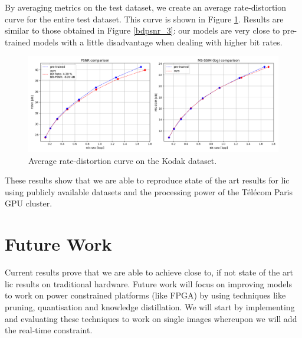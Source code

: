 By averaging metrics on the test dataset, we create an average rate-distortion curve for the entire test dataset. This curve is shown in Figure \ref{bdpsnr_4}. Results are similar to those obtained in Figure \ref{bdpsnr_3}: our models are very close to pre-trained models with a little disadvantage when dealing with higher bit rates.

\begin{figure}
    \centering
    \includegraphics[width=15cm]{img/balle_bdpsnr_4.png}
    \caption{Average rate-distortion curve on the Kodak dataset.}
    \label{bdpsnr_4}
\end{figure}

These results show that we are able to reproduce state of the art results for \acrshort{lic} using publicly available datasets and the processing power of the Télécom Paris GPU cluster.

\section{Future Work}
Current results prove that we are able to achieve close to, if not state of the art \acrshort{lic} results on traditional hardware. Future work will focus on improving models to work on power constrained platforms (like FPGA) by using techniques like pruning, quantisation and knowledge distillation. We will start by implementing and evaluating these techniques to work on single images whereupon we will add the real-time constraint.